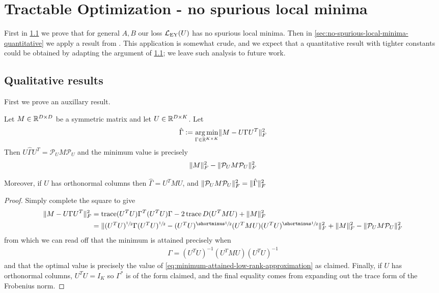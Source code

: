 \graphicspath{{chapters/gradient_descent/}}
\section{Tractable Optimization - no spurious local minima}\label{supp:tractable-optimization}
First in \cref{sec:no-spurious-local-minima-qualitative} we prove that for general $A, B$ our loss $\mathcal{L}_\text{EY}(U)$ has no spurious local minima.
Then in \cref{sec:no-spurious-local-minima-quantitative} we apply a result from \citet{ge_no_2017}.
This application is somewhat crude, and we expect that a quantitative result with tighter constants could be obtained by adapting the argument of \cref{sec:no-spurious-local-minima-qualitative}; we leave such analysis to future work.

\subsection{Qualitative results}\label{sec:no-spurious-local-minima-qualitative}
First we prove an auxillary result.
\begin{lemma}\label{lem:least-squares-projected-signal}
Let $M \in \mathbb{R}^{D \times D}$ be a symmetric matrix and let $U \in \mathbb{R}^{D \times K}$.
Let
\begin{align*}
    \hat{\Gamma} \vcentcolon= \operatorname*{arg\,min}_{\Gamma \in \mathbb{R}^{K \times K}} \lVert M - U \Gamma U^T\rVert_F^2
\end{align*}
Then $U \hat{\Gamma} U^T = \mathcal{P}_U M \mathcal{P}_U$ and the minimum value is precisely
\begin{align}\label{eq:minimum-attained-low-rank-approximation}
\lVert M\rVert_F^2 - \lVert\mathcal{P}_U M \mathcal{P}_U\rVert_F^2
\end{align}

Moreover, if $U$ has orthonormal columns then $\hat{\Gamma} = U^T M U$, and $\lVert\mathcal{P}_U M \mathcal{P}_U\rVert_F^2 = \lVert\hat{\Gamma}\rVert_F^2$
\end{lemma}
\begin{proof}
    Simply complete the square to give
    \begin{align*}
        \norm{M - U \Gamma U^T}_F^2
        &= \tr (U^T U) \Gamma^T (U^T U) \Gamma - 2 \tr D (U^T M U) + \norm{M}_F^2 \\
        &= \norm{(U^T U)^\half \Gamma (U^T U)^\half - (U^T U)^\mhalf (U^T M U) (U^T U)^\mhalf}_F^2 + \norm{M}_F^2 - \norm{\mathcal{P}_U M \mathcal{P}_U}_F^2
    \end{align*}
    from which we can read off that the minimum is attained precisely when
    \begin{align*}
        \Gamma = (U^T U)^{-1} (U^T M U) (U^T U)^{-1}
    \end{align*}
    and that the optimal value is precisely the value of \cref{eq:minimum-attained-low-rank-approximation} as claimed.
    Finally, if $U$ has orthonormal columns, $U^T U = I_K$ so $\Gamma^*$ is of the form claimed, and the final equality comes from expanding out the trace form of the Frobenius norm.
\end{proof}

